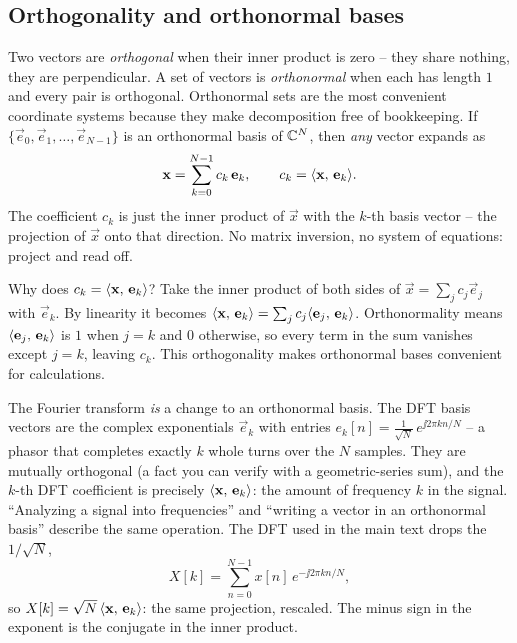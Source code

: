 \subsection{Orthogonality and orthonormal bases}

Two vectors are \emph{orthogonal} when their inner product is zero -- they share nothing, they
are perpendicular. A set of vectors is \emph{orthonormal} when each has length $1$ and every pair
is orthogonal. Orthonormal sets are the most convenient coordinate systems because they make
decomposition free of bookkeeping. If $\{\vec e_0, \vec e_1, \dots, \vec e_{N-1}\}$ is an
orthonormal basis of $\mathbb{C}^N$, then \emph{any} vector expands as
\[
  \mathbf{x} = \sum_{k=0}^{N-1} c_k\,\mathbf{e}_k, \qquad c_k = \langle \mathbf{x},\, \mathbf{e}_k \rangle.
\]
The coefficient $c_k$ is just the inner product of $\vec x$ with the $k$-th basis vector -- the
projection of $\vec x$ onto that direction. No matrix inversion, no system of equations: project
and read off.

\begin{whybox}
Why does $c_k = \langle \mathbf{x},\, \mathbf{e}_k \rangle$? Take the inner product of both sides of $\vec x =
\sum_j c_j \vec e_j$ with $\vec e_k$. By linearity it becomes $\langle \mathbf{x},\, \mathbf{e}_k \rangle = \sum_j
c_j \langle \mathbf{e}_j,\, \mathbf{e}_k \rangle$. Orthonormality means $\langle \mathbf{e}_j,\, \mathbf{e}_k \rangle$ is $1$ when
$j=k$ and $0$ otherwise, so every term in the sum vanishes except $j=k$, leaving $c_k$. This orthogonality makes orthonormal bases convenient for calculations.
\end{whybox}

\begin{happeningbox}
The Fourier transform \emph{is} a change to an orthonormal basis. The DFT basis vectors are the
complex exponentials $\vec e_k$ with entries $e_k[n] = \frac{1}{\sqrt N}\,e^{\jj 2\pi kn/N}$ -- a
phasor that completes exactly $k$ whole turns over the $N$ samples. They are mutually orthogonal
(a fact you can verify with a geometric-series sum), and the $k$-th DFT coefficient is precisely
$\langle \mathbf{x},\, \mathbf{e}_k \rangle$: the amount of frequency $k$ in the signal. ``Analyzing a signal into
frequencies'' and ``writing a vector in an orthonormal basis'' describe the same
operation. The DFT used in the main text drops the $1/\sqrt N$,
\[
  X[k] = \sum_{n=0}^{N-1} x[n]\,e^{-\jj 2\pi kn/N},
\]
so $X[k] = \sqrt N\,\langle \mathbf{x},\, \mathbf{e}_k \rangle$: the same projection, rescaled. The
minus sign in the exponent is the conjugate in the inner product.
\end{happeningbox}

